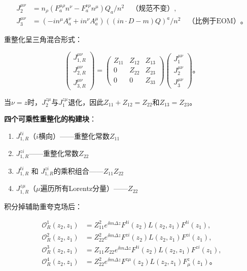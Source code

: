 \documentclass[12pt,a4paper]{ctexart}
\theoremstyle{definition}
\begin{document}
\begin{equation}
\begin{aligned}
J^{\mu\nu}_2 &= n_\rho(F^{\mu\rho}_a n^\nu - F^{\nu\rho}_a n^\mu)Q_a/n^2 \quad \text{（规范不变）}, \\
J^{\mu\nu}_3 &= (-in^\mu A^\nu_a + in^\nu A^\mu_a)((in \cdot D - m)Q)^a/n^2 \quad \text{（比例于EOM）}。
\end{aligned}
\label{eq:mixing_operators}
\end{equation}

重整化呈三角混合形式\cite{Zhang2019}：

\begin{equation}
\begin{pmatrix} J^{\mu\nu}_{1,R} \\ J^{\mu\nu}_{2,R} \\ J^{\mu\nu}_{3,R} \end{pmatrix} =
\begin{pmatrix} Z_{11} & Z_{12} & Z_{13} \\ 0 & Z_{22} & Z_{23} \\ 0 & 0 & Z_{33} \end{pmatrix}
\begin{pmatrix} J^{\mu\nu}_1 \\ J^{\mu\nu}_2 \\ J^{\mu\nu}_3 \end{pmatrix}。
\label{eq:triangular_mixing}
\end{equation}

当$\nu = z$时，$J^{z\mu}_2$与$J^{z\mu}_1$退化，因此$Z_{11} + Z_{12} = Z_{22}$和$Z_{13} = Z_{23}$\cite{Zhang2019}。

\textbf{四个可乘性重整化的构建块}\cite{Zhang2019}：

\begin{enumerate}
    \item $J^{ti}_{1,R}$（$i$横向）——重整化常数$Z_{11}$
    \item $J^{zi}_{1,R}$——重整化常数$Z_{22}$
    \item $J^{ti}_{1,R}$ 和 $J^{zi}_{1,R}$的乘积组合——$Z_{11}Z_{22}$
    \item $J^{z\mu}_{1,R}$（$\mu$遍历所有Lorentz分量）——$Z_{22}$
\end{enumerate}

积分掉辅助重夸克场后\cite{Zhang2019}：

\begin{equation}
\begin{aligned}
\mathcal{O}^1_R(z_2, z_1) &= Z^2_{11} e^{\delta m \Delta z} F^{ti}(z_2) L(z_2, z_1) F^{ti}(z_1), \\
\mathcal{O}^2_R(z_2, z_1) &= Z^2_{22} e^{\delta m \Delta z} F^{zi}(z_2) L(z_2, z_1) F^{zi}(z_1), \\
\mathcal{O}^3_R(z_2, z_1) &= Z_{11}Z_{22} e^{\delta m \Delta z} F^{ti}(z_2) L(z_2, z_1) F^{zi}(z_1), \\
\mathcal{O}^4_R(z_2, z_1) &= Z^2_{22} e^{\delta m \Delta z} F^{z\mu}(z_2) L(z_2, z_1) F^z_\mu(z_1)。
\end{aligned}
\label{eq:four_building_blocks}
\end{equation}
\end{document}
